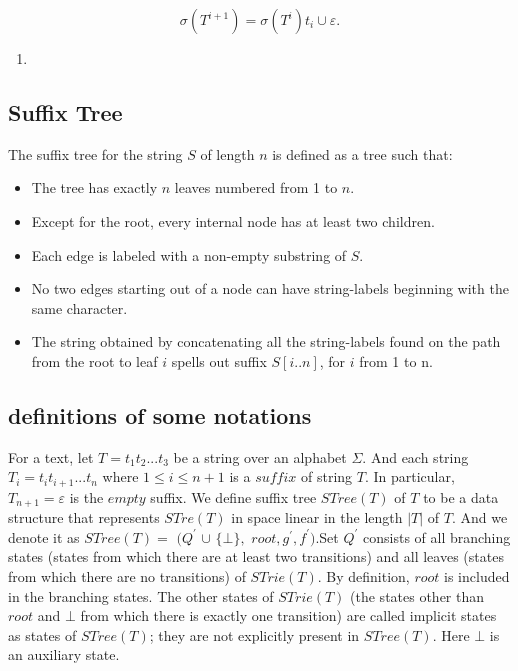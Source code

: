 \documentclass[paper=a4, fontsize=11pt]{scrartcl} %
\numberwithin{equation}{section} %
\numberwithin{figure}{section} %
\numberwithin{table}{section} %
\begin{document}
$$
\sigma(T^{i+1}) = \sigma(T^i)t_i \cup \varepsilon.
$$


\begin{enumerate}
  \item
\end{enumerate}


\subsection{Suffix Tree}

The suffix tree for the string $S$ of length $n$ is defined as a tree such that:
\begin{itemize}
  \item The tree has exactly $n$ leaves numbered from 1 to $n$.
  \item Except for the root, every internal node has at least two children.
  \item Each edge is labeled with a non-empty substring of $S$.
  \item No two edges starting out of a node can have string-labels beginning with the same character.
  \item  The string obtained by concatenating all the string-labels found on the path from the root to leaf $i$ spells out suffix $S[i..n]$, for $i$ from 1 to n.
\end{itemize}

\subsection{definitions of some notations}
For a text, let $T = t_1t_2...t_3$ be a string over an alphabet $\Sigma$. And each string $T_i = t_it_{i+1}...t_n$ where $1 \leq i \leq n+1$ is a $suffix$ of string $T$. In particular, $T_{n+1} = \varepsilon$ is the $empty$ suffix. We define suffix tree $STree(T)$ of $T$ to be a data structure that represents $STre(T)$ in space linear in the length $|T|$ of $T$. And we denote it as $STree(T) =$
$(Q^{'}$
$\cup$
$\{\bot\},$
$root, g^{'}, f^{'})$.Set $Q^{'}$ consists of all branching states (states from which there
are at least two transitions) and all leaves (states from which there are no transitions) of $STrie(T)$. By definition, $root$ is included in the branching states.
The other states of $STrie(T)$ (the states other than $root$ and $\bot$ from which
there is exactly one transition) are called implicit states as states of $STree(T)$; they
are not explicitly present in $STree(T)$. Here $\bot$ is an auxiliary state.
\end{document}
